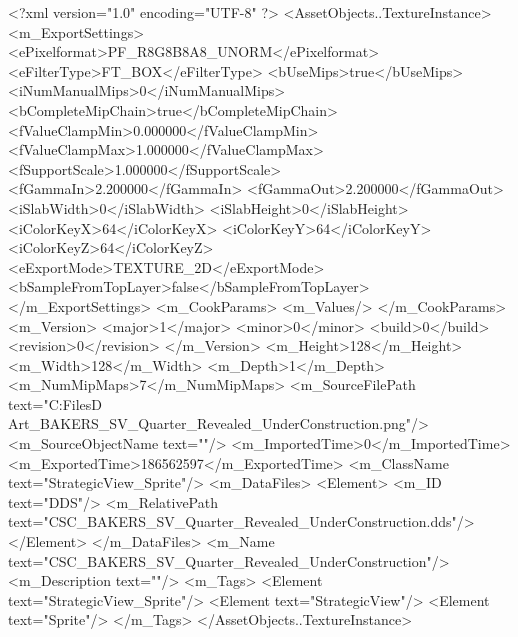 <?xml version="1.0" encoding="UTF-8" ?>
<AssetObjects..TextureInstance>
	<m_ExportSettings>
		<ePixelformat>PF_R8G8B8A8_UNORM</ePixelformat>
		<eFilterType>FT_BOX</eFilterType>
		<bUseMips>true</bUseMips>
		<iNumManualMips>0</iNumManualMips>
		<bCompleteMipChain>true</bCompleteMipChain>
		<fValueClampMin>0.000000</fValueClampMin>
		<fValueClampMax>1.000000</fValueClampMax>
		<fSupportScale>1.000000</fSupportScale>
		<fGammaIn>2.200000</fGammaIn>
		<fGammaOut>2.200000</fGammaOut>
		<iSlabWidth>0</iSlabWidth>
		<iSlabHeight>0</iSlabHeight>
		<iColorKeyX>64</iColorKeyX>
		<iColorKeyY>64</iColorKeyY>
		<iColorKeyZ>64</iColorKeyZ>
		<eExportMode>TEXTURE_2D</eExportMode>
		<bSampleFromTopLayer>false</bSampleFromTopLayer>
	</m_ExportSettings>
	<m_CookParams>
		<m_Values/>
	</m_CookParams>
	<m_Version>
		<major>1</major>
		<minor>0</minor>
		<build>0</build>
		<revision>0</revision>
	</m_Version>
	<m_Height>128</m_Height>
	<m_Width>128</m_Width>
	<m_Depth>1</m_Depth>
	<m_NumMipMaps>7</m_NumMipMaps>
	<m_SourceFilePath text="C:\Users\Shadow\Desktop\Working Files\2D Art\Quarters\Bakers\StrategicView\CSC_BAKERS_SV_Quarter_Revealed_UnderConstruction.png"/>
	<m_SourceObjectName text=""/>
	<m_ImportedTime>0</m_ImportedTime>
	<m_ExportedTime>186562597</m_ExportedTime>
	<m_ClassName text="StrategicView_Sprite"/>
	<m_DataFiles>
		<Element>
			<m_ID text="DDS"/>
			<m_RelativePath text="CSC_BAKERS_SV_Quarter_Revealed_UnderConstruction.dds"/>
		</Element>
	</m_DataFiles>
	<m_Name text="CSC_BAKERS_SV_Quarter_Revealed_UnderConstruction"/>
	<m_Description text=""/>
	<m_Tags>
		<Element text="StrategicView_Sprite"/>
		<Element text="StrategicView"/>
		<Element text="Sprite"/>
	</m_Tags>
</AssetObjects..TextureInstance>

